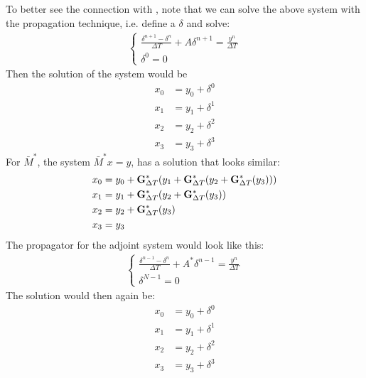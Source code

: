 \documentclass[11pt,a4paper]{article}
\begin{document}
To better see the connection with \cite{lions2001resolution}, note that we can solve the above system with the propagation technique, i.e. define a $\delta$ and solve:
\begin{align}
\left\{
     \begin{array}{lr}
		\frac{\delta^{n+1} -\delta^n }{\Delta T } + A\delta^{n+1} = \frac{y^n}{\Delta T} \\
		\delta^0 = 0
	\end{array} \right.
\end{align} 
Then the solution of the system would be 
\begin{align*}
x_0 &=y_0 +\delta^0\\
x_1 &=y_1 + \delta^1 \\
x_2 &=y_2 +\delta^2\\
x_3 &=y_3 + \delta^3 
\end{align*}
For $\bar{M}^{*}$, the system $\bar{M}^{*}x=y$, has a solution that looks similar:
\begin{align*}
x_0 &=y_0 +\bold{G}_{\Delta T}^*(y_1 + \bold{G}_{\Delta T}^*(y_2 + \bold{G}_{\Delta T}^*(y_ 3)))\\
x_1 &=y_1 + \bold{G}_{\Delta T}^*(y_2 + \bold{G}_{\Delta T}^*(y_ 3))\\
x_2 &=y_2 + \bold{G}_{\Delta T}^*(y_ 3) \\
x_3 &=y_3 
\end{align*}
The propagator for the adjoint system would look like this:
\begin{align}
\left\{
     \begin{array}{lr}
		\frac{\delta^{n-1} -\delta^n }{\Delta T } + A^*\delta^{n-1} = \frac{y^n}{\Delta T} \\
		\delta^{N-1} = 0
	\end{array} \right.
\end{align} 
The solution would then again be:
\begin{align*}
x_0 &=y_0 +\delta^0\\
x_1 &=y_1 + \delta^1 \\
x_2 &=y_2 +\delta^2\\
x_3 &=y_3 + \delta^3 
\end{align*}
\end{document}
